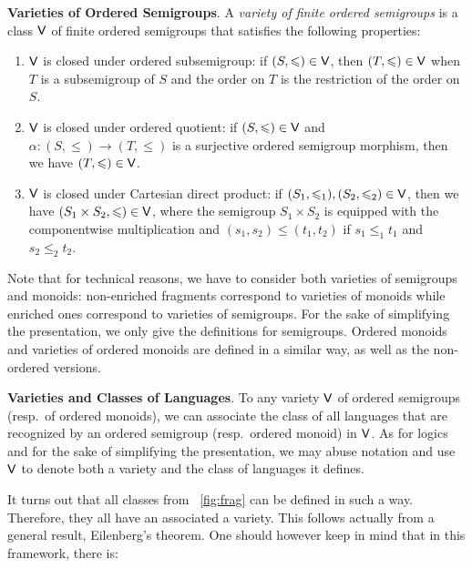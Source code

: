 \documentclass[a4paper,USenglish]{lipics}
\newcommand\Vbf{\ensuremath{{\sf V}}\xspace}
\newcommand\highlight[1]{\par\bigskip\noindent\textbf{\sffamily #1}.}
\theoremstyle{plain}
\begin{document}
\highlight{Varieties of Ordered Semigroups} A \emph{variety of finite
  ordered semigroups} is a class \Vbf of finite ordered semigroups
that satisfies the following properties:
\begin{enumerate}
\item \Vbf is closed under ordered subsemigroup: if $(S,\leqslant) \in
  \Vbf$, then $(T,\leqslant) \in \Vbf$ when $T$ is a subsemigroup of $S$ and the order
  on $T$ is the restriction of the order on $S$.
\item \Vbf is closed under ordered quotient: if $(S,\leqslant) \in
  \Vbf$ and $\alpha: (S,\leqslant) \rightarrow (T,\leqslant)$ is a surjective ordered semigroup
  morphism, then we have $(T,\leqslant) \in \Vbf$.
\item \Vbf is closed under Cartesian direct product: if $(S_1,\leqslant_1),(S_2,\leqslant_2) \in \Vbf$,
  then we have $(S_1\times S_2,\leqslant)\in\Vbf$, where the semigroup $S_1 \times S_2$ is
  equipped with the componentwise multiplication and $(s_1,s_2) \leqslant
  (t_1,t_2)$ if $s_1\leqslant_1t_1$ and $s_2\leqslant_2t_2$.
\end{enumerate}

Note that for technical reasons, we have to consider both varieties of
semigroups and monoids: non-enriched fragments correspond to varieties of
monoids while enriched ones correspond to varieties of semigroups. For the
sake of simplifying the presentation, we only give the definitions for
semigroups. Ordered monoids and varieties of ordered monoids are defined in a
similar way, as well as the non-ordered versions.





\highlight{Varieties and Classes of Languages} To any variety \Vbf of ordered
semigroups (resp.~of ordered monoids), we can associate the class of all languages
that are recognized by an ordered semigroup (resp.~ordered monoid) in
\Vbf. As for logics and for the sake of simplifying the presentation, we may
abuse notation and use \Vbf to denote both a variety and the class of
languages it defines.

It turns out that all classes from \figurename~\ref{fig:frag} can be defined
in such a way. Therefore, they all have an associated a variety. This follows
actually from a general result, Eilenberg's theorem.  One should however keep
in mind that in this framework, there is:
\end{document}
